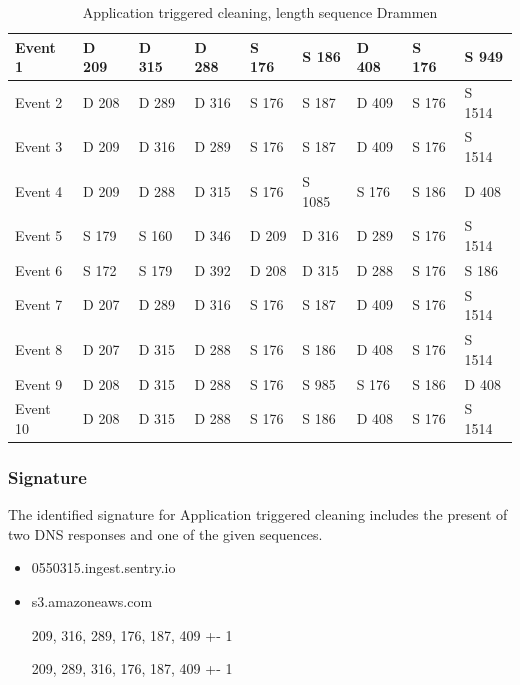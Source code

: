 \begin{table}[H]
\centering
\caption{Application triggered cleaning, length sequence Drammen}
\label{tab:ACSequenceDrammen}
\begin{tabular}{|l|l|l|l|l|l|l|l|l|}
\hline
Event 1  & D 209 & D 315 & D 288 & S 176 & S 186  & D 408 & S 176 & S 949  \\ \hline
Event 2  & D 208 & D 289 & D 316 & S 176 & S 187  & D 409 & S 176 & S 1514 \\ \hline
Event 3  & D 209 & D 316 & D 289 & S 176 & S 187  & D 409 & S 176 & S 1514 \\ \hline
Event 4  & D 209 & D 288 & D 315 & S 176 & S 1085 & S 176 & S 186 & D 408  \\ \hline
Event 5  & S 179 & S 160 & D 346 & D 209 & D 316  & D 289 & S 176 & S 1514 \\ \hline
Event 6  & S 172 & S 179 & D 392 & D 208 & D 315  & D 288 & S 176 & S 186  \\ \hline
Event 7  & D 207 & D 289 & D 316 & S 176 & S 187  & D 409 & S 176 & S 1514 \\ \hline
Event 8  & D 207 & D 315 & D 288 & S 176 & S 186  & D 408 & S 176 & S 1514 \\ \hline
Event 9  & D 208 & D 315 & D 288 & S 176 & S 985  & S 176 & S 186 & D 408  \\ \hline
Event 10 & D 208 & D 315 & D 288 & S 176 & S 186  & D 408 & S 176 & S 1514 \\ \hline
\end{tabular}
\end{table}

\subsubsection{Signature}
The identified signature for Application triggered cleaning includes the present of two DNS
responses and one of the given sequences.
\begin{itemize}
    \item 0550315.ingest.sentry.io
    \item s3.amazoneaws.com
    \item [209, 316, 289, 176, 187, 409] +- 1
    \item [209, 289, 316, 176, 187, 409] +- 1
\end{itemize}

